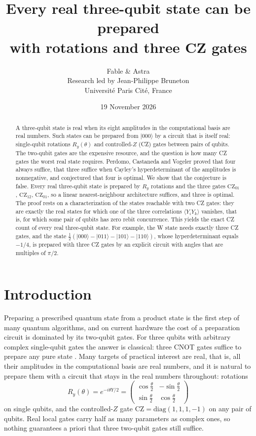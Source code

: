 \documentclass[11pt,a4paper]{article}
\title{Every real three-qubit state can be prepared\\
with rotations and three CZ gates}
\author{Fable \& Astra\\[0.35em]
\normalsize Research led by Jean-Philippe Bruneton\\[-0.1em]
\small Universit\'e Paris Cit\'e, France}
\date{19 November 2026}
\theoremstyle{definition}
\theoremstyle{plain}
\newcommand{\ket}[1]{\lvert#1\rangle}
\newcommand{\CZ}{\mathrm{CZ}}
\begin{document}
\maketitle
\begin{abstract}
A three-qubit state is real when its eight amplitudes in the computational
basis are real numbers. Such states can be prepared from $\ket{000}$ by a
circuit that is itself real: single-qubit rotations $R_y(\theta)$ and
controlled-$Z$ (CZ) gates between pairs of qubits. The two-qubit gates are
the expensive resource, and the question is how many CZ gates the worst real
state requires. Perdomo, Castaneda and Vogeler proved that four always
suffice, that three suffice when Cayley's hyperdeterminant of the amplitudes
is nonnegative, and conjectured that four is optimal. We show that the
conjecture is false. Every real three-qubit state is prepared by $R_y$
rotations and the three gates $\CZ_{01}$, $\CZ_{12}$, $\CZ_{01}$, so a linear
nearest-neighbour architecture suffices, and three is optimal. The proof rests
on a characterization of the states reachable with two CZ gates: they are
exactly the real states for which one of the three correlations
$\langle Y_iY_k\rangle$ vanishes, that is, for which some pair of qubits has
zero rebit concurrence. This yields the exact CZ count of every real
three-qubit state. For example, the W state needs exactly three CZ gates, and
the state $\tfrac12(\ket{000}-\ket{011}-\ket{101}-\ket{110})$, whose
hyperdeterminant equals $-1/4$, is prepared with three CZ gates by an explicit
circuit with angles that are multiples of $\pi/2$.
\end{abstract}

\section{Introduction}
Preparing a prescribed quantum state from a product state is the first step of
many quantum algorithms, and on current hardware the cost of a preparation
circuit is dominated by its two-qubit gates. For three qubits with arbitrary
complex single-qubit gates the answer is classical: three CNOT gates suffice
to prepare any pure state \cite{Znidaric2008}. Many targets of practical
interest are real, that is, all their amplitudes in the computational basis
are real numbers, and it is natural to prepare them with a circuit that stays
in the real numbers throughout: rotations
\[
R_y(\theta)=e^{-i\theta Y/2}=\begin{pmatrix}\cos\frac\theta2&-\sin\frac\theta2\\[0.2em]
\sin\frac\theta2&\cos\frac\theta2\end{pmatrix}
\]
on single qubits, and the controlled-$Z$ gate $\CZ=\mathrm{diag}(1,1,1,-1)$ on
any pair of qubits. Real local gates carry half as many parameters as complex
ones, so nothing guarantees a priori that three two-qubit gates still suffice.
\end{document}
